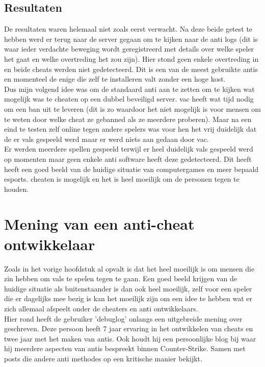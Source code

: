 \documentclass[pdftex,a4paper,12pt,twoside]{report}
\begin{document}
\section{Resultaten}
\label{sec:resultaten}
De resultaten waren helemaal niet zoals eerst verwacht. Na deze beide getest te hebben werd er terug naar de server gegaan om te kijken naar de \gls{anti} logs (dit is waar ieder verdachte beweging wordt geregistreerd met details over welke speler het gaat en welke overtreding het zou zijn). Hier stond geen enkele overtreding in en beide \gls{cheat}s werden niet gedetecteerd. Dit is een van de meest gebruikte \gls{anti}s en momenteel de enige die zelf te installeren valt zonder een hoge kost. 
\\

Dus mijn volgend idee was om de standaard \gls{anti} aan te zetten om te kijken wat mogelijk was te \gls{cheat}en op een dubbel beveiligd server. \gls{vac} heeft wat tijd nodig om een ban uit te leveren (dit is zo waardoor het niet mogelijk is voor mensen om te weten door welke \gls{cheat} ze gebanned als ze meerdere proberen). Maar na een eind te testen zelf online tegen andere spelers was voor hen het vrij duidelijk dat de er vals gespeeld werd maar er werd niets aan gedaan door \gls{vac}.
\\

Er werden meerdere spellen gespeeld terwijl er heel duidelijk vals gespeeld werd op momenten maar geen enkele \gls{anti} software heeft deze gedetecteerd. Dit heeft heeft een goed beeld van de huidige situatie van computergames en meer bepaald \gls{esports}. \Gls{cheat}en is mogelijk en het is heel moeilijk om de personen tegen te houden.

\chapter{Mening van een anti-cheat ontwikkelaar}
\label{ch:mening}
Zoals in het vorige hoofdstuk al opvalt is dat het heel moeilijk is om mensen die zin hebben om vals te spelen tegen te gaan. Een goed beeld krijgen van de huidige situatie als buitenstaander is dan ook heel moeilijk, zelf voor een speler die er dagelijks mee bezig is kan het moeilijk zijn om een idee te hebben wat er zich allemaal afspeelt onder de \gls{cheat}ers en \gls{anti} ontwikkelaars. 
\\

Hier rond heeft de gebruiker 'debuglog' onlangs een uitgebreide mening over geschreven. Deze persoon heeft 7 jaar ervaring in het ontwikkelen van \gls{cheat}s en twee jaar met het maken van \gls{anti}s. Ook houdt hij een persoonlijke blog bij waar hij meerdere aspecten van \gls{anti}s bespreekt binnen Counter-Strike. Samen met posts die andere \gls{anti} methodes op een kritische manier bekijkt.\citep{debuglogblog}
\\
\end{document}

